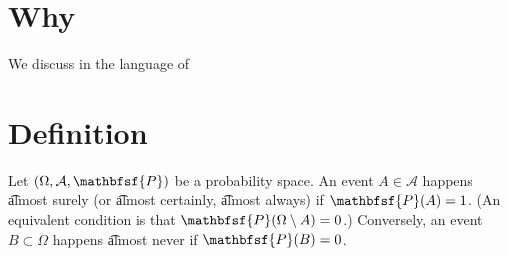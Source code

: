 
\section*{Why}

We discuss in the language of 

\section*{Definition}

Let $(\Omega , \mathcal{A} , \mathbfsf{P} )$ be a probability space.
An event $A \in \mathcal{A} $ happens \t{almost surely} (or \t{almost certainly}, \t{almost always}) if $\mathbfsf{P} (A) = 1$.
(An equivalent condition is that $\mathbfsf{P} (\Omega  \setminus A) = 0$.)
Conversely, an event $B \subset \Omega $ happens \t{almost never} if $\mathbfsf{P} (B) = 0$.

\blankpage